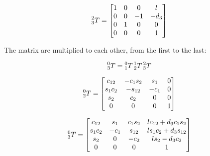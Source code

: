 \documentclass{exam}
\begin{document}
\begin{questions}
\begin{parts}
\begin{equation}
  \prescript{2}{3}T = \begin{bmatrix}
    1 & 0 & 0  & l      \\
    0 & 0 & -1 & -d_{3} \\
    0 & 1 & 0  & 0      \\
    0 & 0 & 0  & 1      \\ 
                      \end{bmatrix}
\end{equation}

The matrix are multiplied to each other, from the first to the last:

\begin{equation}
  \prescript{0}{3}T = \prescript{0}{1}T\prescript{1}{2}T\prescript{2}{3}T
\end{equation}

\begin{equation}
  \prescript{0}{2}T = \begin{bmatrix}
    c_{12}     & -c_{1}s_{2} & s_{1}  & 0 \\
    s_{1}c_{2} & -s_{12}     & -c_{1} & 0 \\
    s_{2}      & c_{2}       & 0      & 0 \\
    0          & 0           & 0      & 1 \\ 
                      \end{bmatrix}
\end{equation}

\begin{equation}
  \prescript{0}{3}T = \begin{bmatrix}
    c_{12}     & s_{1}  & c_{1}s_{2} & lc_{12} + d_{3}c_{1}s_{2} \\
    s_{1}c_{2} & -c_{1} & s_{12}     & ls_{1}c_{2} + d_{3}s_{12} \\
    s_{2}      & 0      & -c_{2}     & ls_{2} - d_{3}c_{2}       \\
    0          & 0      & 0          & 1                         \\ 
                      \end{bmatrix}
\end{equation}

\end{parts}

\question
\begin{parts}

\part


\end{parts}
\end{questions}
\end{document}
